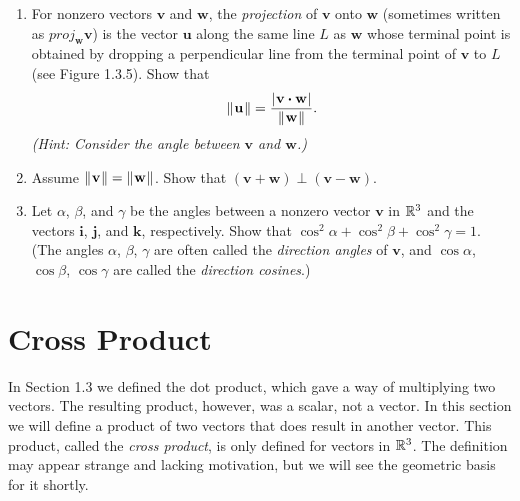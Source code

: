 \begin{enumerate}[\bfseries 1.]
 \piccaption[]{}
 \item \label{ex:projection} 
 For nonzero vectors $\mathbf{v}$ and $\mathbf{w}$, the \emph{projection} of $\mathbf{v}$ onto $\mathbf{w}$ (sometimes written as $proj_{\mathbf{w}}\mathbf{v}$) is the vector $\mathbf{u}$ along the same line $L$ as
  $\mathbf{w}$ whose terminal point is obtained by dropping a perpendicular line from the terminal point of $\mathbf{v}$
  to $L$ (see Figure 1.3.5). Show that
  \begin{displaymath}
   \lVert\mspace{1mu}\mathbf{u}\mspace{1mu}\rVert = \frac{\lvert\mspace{1mu}\mathbf{v} \bm{\cdot} \mathbf{w}\mspace{1mu}\rvert}{\lVert\mspace{1mu}\mathbf{w}\mspace{1mu}\rVert}.
  \end{displaymath}
  \emph{(Hint: Consider the angle between $\mathbf{v}$ and $\mathbf{w}$.)}
  \item Assume $\lVert\mspace{1mu}\mathbf{v}\mspace{1mu}\rVert=\lVert\mspace{1mu}\mathbf{w}\mspace{1mu}\rVert$. 
  Show that 
  $(\mathbf{v}+\mathbf{w})\perp(\mathbf{v}-\mathbf{w})$.
  \item Let $\alpha$, $\beta$, and $\gamma$ be the angles between a nonzero vector $\mathbf{v}$ in $\mathbb{R}^{3}$ and the
  vectors $\mathbf{i}$, $\mathbf{j}$, and $\mathbf{k}$, respectively. 
  Show that $\cos^2 \alpha + \cos^2 \beta +
  \cos^2 \gamma = 1$.
  (The angles $\alpha$, $\beta$, $\gamma$ are often called the \emph{direction angles} of $\mathbf{v}$,
  and $\cos \alpha$, $\cos \beta$, $\cos \gamma$ are called the \emph{direction cosines}.)
\end{enumerate}


\newpage
\section{Cross Product}
In Section 1.3 we defined the dot product, which gave a way of multiplying two vectors. The resulting product,
however, was a scalar, not a vector. In this section we will define a product of two vectors that does result in
another vector. This product, called the \emph{cross product}, is only defined for vectors
in $\mathbb{R}^{3}$. The definition may appear strange and lacking motivation, but we will see the geometric basis for
it shortly.


